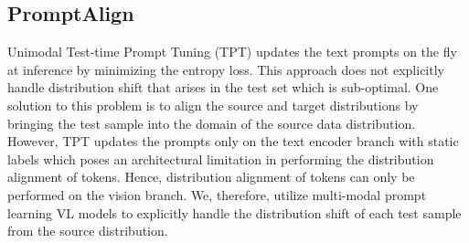\documentclass[a4paper]{article}
\begin{document}


\subsection{PromptAlign}
\label{our_approach}

Unimodal Test-time Prompt Tuning (TPT) \cite{shu2022test} updates the text prompts on the fly at inference by minimizing the entropy loss. This approach does not explicitly handle distribution shift that arises in the test set which is sub-optimal. One solution to this problem is to align the source and target distributions by bringing the test sample into the domain of the source data distribution. However, TPT updates the prompts only on the text encoder branch with static labels which poses an architectural limitation in performing the distribution alignment of tokens. Hence, distribution alignment of tokens can only be performed on the vision branch. We, therefore, utilize multi-modal prompt learning VL models \cite{khattakMaPLe} to explicitly handle the distribution shift of each test sample from the source distribution. \par
\end{document}
